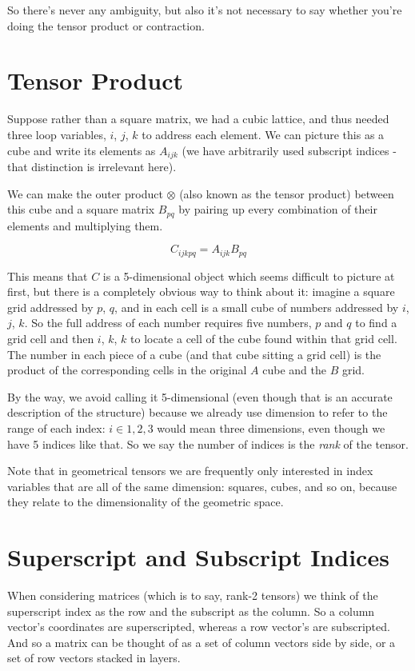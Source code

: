 So there's never any ambiguity, but also it's not necessary to say whether you're doing the tensor product or contraction.

\section{Tensor Product}

Suppose rather than a square matrix, we had a cubic lattice, and thus needed three loop variables, $i$, $j$, $k$ to address each element. We can picture this as a cube and write its elements as $A_{ijk}$ (we have arbitrarily used subscript indices - that distinction is irrelevant here).

We can make the outer product $\otimes$ (also known as the tensor product) between this cube and a square matrix $B_{pq}$ by pairing up every combination of their elements and multiplying them.

$$C_{ijkpq} = A_{ijk}B_{pq}$$

This means that $C$ is a 5-dimensional object which seems difficult to picture at first, but there is a completely obvious way to think about it: imagine a square grid addressed by $p$, $q$, and in each cell is a small cube of numbers addressed by $i$, $j$, $k$. So the full address of each number requires five numbers, $p$ and $q$ to find a grid cell and then $i$, $k$, $k$ to locate a cell of the cube found within that grid cell. The number in each piece of a cube (and that cube sitting a grid cell) is the product of the corresponding cells in the original $A$ cube and the $B$ grid.

By the way, we avoid calling it 5-dimensional (even though that is an accurate description of the structure) because we already use dimension to refer to the range of each index: $i \in {1, 2, 3}$ would mean three dimensions, even though we have 5 indices like that. So we say the number of indices is the \textit{rank} of the tensor.

Note that in geometrical tensors we are frequently only interested in index variables that are all of the same dimension: squares, cubes, and so on, because they relate to the dimensionality of the geometric space.

\section{Superscript and Subscript Indices}

When considering matrices (which is to say, rank-2 tensors) we think of the superscript index as the row and the subscript as the column. So a column vector's coordinates are superscripted, whereas a row vector's are subscripted. And so a matrix can be thought of as a set of column vectors side by side, or a set of row vectors stacked in layers.

